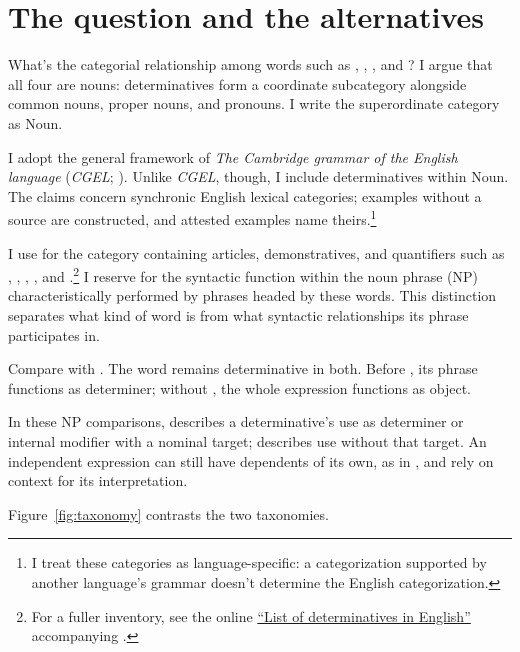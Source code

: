 \documentclass[12pt]{article}
\begin{document}
\section{The question and the alternatives}\label{sec:intro}

What's the categorial relationship among words such as , , , and ? I argue that all four are nouns: determinatives form a coordinate subcategory alongside common nouns, proper nouns, and pronouns. I write the superordinate category as Noun.

I adopt the general framework of \textit{The Cambridge grammar of the English language} (\textit{CGEL}; \citealp{huddleston2002}). Unlike \textit{CGEL}, though, I include determinatives within Noun. The claims concern synchronic English lexical categories; examples without a source are constructed, and attested examples name theirs.\footnote{I treat these categories as language-specific: a categorization supported by another language's grammar doesn't determine the English categorization.}

I use  for the category containing articles, demonstratives, and quantifiers such as , , , , and .\footnote{For a fuller inventory, see the online \href{https://www.cambridge.org/highereducation/api/resources/2AC8DF5CA558F8A6FCDFACD0EAF8EA08}{\enquote{List of determinatives in English}} accompanying \textcite{Huddleston2021}.} I reserve  for the syntactic function within the noun phrase (NP) characteristically performed by phrases headed by these words. This distinction separates what kind of word  is from what syntactic relationships its phrase participates in.

Compare  with . The word  remains determinative in both. Before , its phrase functions as determiner; without , the whole expression functions as object.

In these NP comparisons,  describes a determinative's use as determiner or internal modifier with a nominal target;  describes use without that target. An independent expression can still have dependents of its own, as in , and rely on context for its interpretation.

Figure~\ref{fig:taxonomy} contrasts the two taxonomies.
\end{document}
